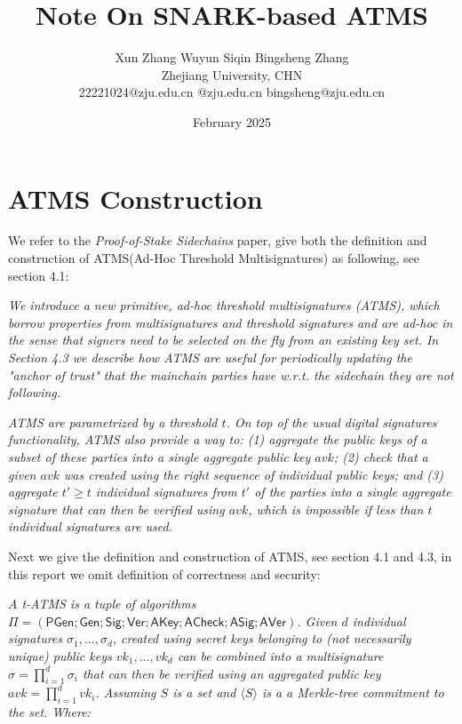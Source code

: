 \documentclass{article}
\title{Note On SNARK-based ATMS}
\author{Xun Zhang \quad \quad Wuyun Siqin \quad \quad Bingsheng Zhang \\ 
Zhejiang University, CHN \\
22221024@zju.edu.cn \quad 3210101763@zju.edu.cn \quad bingsheng@zju.edu.cn}
\date{February 2025}
\begin{document}
\maketitle

\section{ATMS Construction}

We refer to the \textit{Proof-of-Stake Sidechains} paper, give both the definition and construction of ATMS(Ad-Hoc Threshold Multisignatures) as following, see section 4.1:

\vspace{0.3cm}


\textit{We introduce a new primitive, ad-hoc threshold multisignatures (ATMS), which borrow properties from
multisignatures and threshold signatures and are ad-hoc in the sense that signers need to be selected on the
fly from an existing key set. In Section 4.3 we describe how ATMS are useful for periodically updating the "anchor of trust" that the mainchain parties have w.r.t. the sidechain they are not following.}


\textit{ATMS are parametrized by a threshold $t$. On top of the usual digital signatures functionality, ATMS also provide a way to: (1) aggregate the public keys of a subset of these parties into a single aggregate public key $avk$; (2) check that a given $avk$ was created using the right sequence of individual public keys; and (3) aggregate $t' \geq t$ individual signatures from $t'$ of the parties into a single aggregate signature that can then be verified using $avk$, which is impossible if less than $t$ individual signatures are used.}

\vspace{0.3cm}


Next we give the definition and construction of ATMS, see section 4.1 and 4.3, in this report we omit definition of correctness and security:

\vspace{0.3cm}

\textit{A t-ATMS is a tuple of algorithms $\Pi = (\mathsf{PGen; Gen; Sig; Ver; AKey; ACheck; ASig; AVer})$.
Given $d$ individual signatures $\sigma_1, \ldots, \sigma_d$, created using secret keys belonging to (not
necessarily unique) public keys $vk_1, \ldots, vk_d$ can be combined into a multisignature $\sigma = \prod_{i=1}^d \sigma_i$ that can then be verified using an aggregated public key $avk = \prod_{i=1}^d vk_i$.
Assuming $S$ is a set and $\langle S \rangle$ is a a Merkle-tree commitment to the set. Where:}
\end{document}
